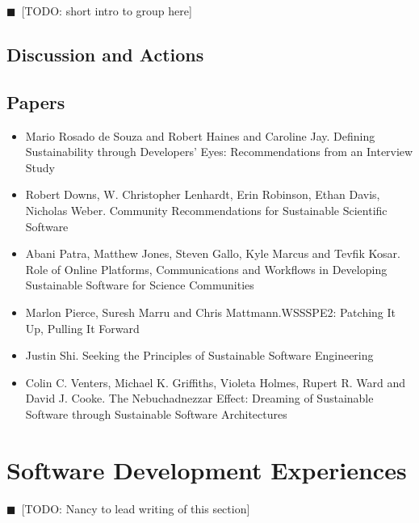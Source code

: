 \documentclass[11pt, oneside]{amsart}
\newcommand{\todo}[1]{{\color{blue}$\blacksquare$~\textsf{[TODO: #1]}}}
\begin{document}
\todo{short intro to group here}

\subsection{Discussion and Actions}

\subsection{Papers}
\begin{itemize}
\item Mario {Rosado de Souza} and Robert Haines and Caroline Jay. Defining
Sustainability through Developers' Eyes: Recommendations from an Interview
Study~\cite{wssspe2_rosada_de_souza}

\item Robert Downs, W. Christopher Lenhardt, Erin Robinson, Ethan Davis,
Nicholas Weber. Community Recommendations for Sustainable Scientific
Software~\cite{wssspe2_downs}

\item Abani Patra, Matthew Jones, Steven Gallo, Kyle Marcus and Tevfik Kosar.
Role of Online Platforms, Communications and Workflows in Developing Sustainable
Software for Science Communities~\cite{wssspe2_patra}

\item Marlon Pierce, Suresh Marru and Chris Mattmann.{WSSSPE2}: Patching It Up,
Pulling It Forward~\cite{wssspe2_pierce}

\item Justin Shi. Seeking the Principles of Sustainable Software
Engineering~\cite{wssspe2_shi}

\item Colin C. Venters, Michael K. Griffiths, Violeta Holmes, Rupert R. Ward and
David J. Cooke. The Nebuchadnezzar Effect: Dreaming of Sustainable Software
through Sustainable Software Architectures~\cite{wssspe2_venters}
\end{itemize}

\section{Software Development Experiences}
\todo{Nancy to lead writing of this section}
\end{document}
